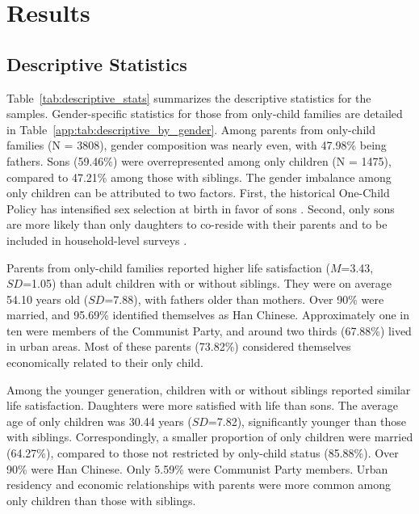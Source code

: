 \section{Results}
\label{sec:ch2-results}

\subsection{Descriptive Statistics}

Table~\ref{tab:descriptive_stats} summarizes the descriptive statistics for the samples. Gender-specific statistics for those from only-child families are detailed in Table~\ref{app:tab:descriptive_by_gender}. Among parents from only-child families (N = 3808), gender composition was nearly even, with 47.98\% being fathers. Sons (59.46\%) were overrepresented among only children (N = 1475), compared to 47.21\% among those with siblings. The gender imbalance among only children can be attributed to two factors. First, the historical One-Child Policy has intensified sex selection at birth in favor of sons \parencite{zhuChinasExcessMales2009}. Second, only sons are more likely than only daughters to co-reside with their parents and to be included in household-level surveys \parencite{fengChengshiDushengZinu2009}.

Parents from only-child families reported higher life satisfaction ($M$=3.43, \\$SD$=1.05) than adult children with or without siblings. They were on average 54.10 years old ($SD$=7.88), with fathers older than mothers. Over 90\% were married, and 95.69\% identified themselves as Han Chinese. Approximately one in ten were members of the Communist Party, and around two thirds (67.88\%) lived in urban areas. Most of these parents (73.82\%) considered themselves economically related to their only child.

    Among the younger generation, children with or without siblings reported similar life satisfaction. Daughters were more satisfied with life than sons. The average age of only children was 30.44 years ($SD$=7.82), significantly younger than those with siblings. Correspondingly, a smaller proportion of only children were married (64.27\%), compared to those not restricted by only-child status (85.88\%). Over 90\% were Han Chinese. Only 5.59\% were Communist Party members. Urban residency and economic relationships with parents were more common among only children than those with siblings.


